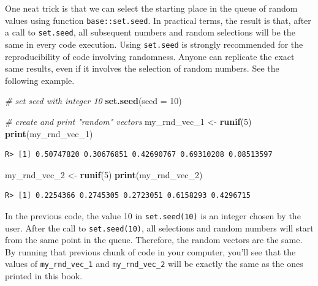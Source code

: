 \documentclass[
  12pt,
]{book}
\newenvironment{Shaded}{\begin{snugshade}}{\end{snugshade}}
\newcommand{\CommentTok}[1]{\textcolor[rgb]{0.37,0.37,0.37}{\textit{#1}}}
\newcommand{\DataTypeTok}[1]{\textcolor[rgb]{0.27,0.27,0.27}{#1}}
\newcommand{\DecValTok}[1]{\textcolor[rgb]{0.06,0.06,0.06}{#1}}
\newcommand{\KeywordTok}[1]{\textcolor[rgb]{0.27,0.27,0.27}{\textbf{#1}}}
\newcommand{\NormalTok}[1]{#1}
\newcommand{\StringTok}[1]{\textcolor[rgb]{0.5,0.5,0.5}{#1}}
\begin{document}
One neat trick is that we can select the starting place in the queue of random values using function \texttt{base::set.seed}. In practical terms, the result is that, after a call to \texttt{set.seed}, all subsequent numbers and random selections will be the same in every code execution. Using \texttt{set.seed} is strongly recommended for the reproducibility of code involving randomness. Anyone can replicate the exact same results, even if it involves the selection of random numbers. See the following example. 

\begin{Shaded}
\begin{Highlighting}[]
\CommentTok{# set seed with integer 10}
\KeywordTok{set.seed}\NormalTok{(}\DataTypeTok{seed =} \DecValTok{10}\NormalTok{)}

\CommentTok{# create and print "random" vectors}
\NormalTok{my_rnd_vec_}\DecValTok{1}\NormalTok{ <-}\StringTok{ }\KeywordTok{runif}\NormalTok{(}\DecValTok{5}\NormalTok{)}
\KeywordTok{print}\NormalTok{(my_rnd_vec_}\DecValTok{1}\NormalTok{)}
\end{Highlighting}
\end{Shaded}

\begin{verbatim}
R> [1] 0.50747820 0.30676851 0.42690767 0.69310208 0.08513597
\end{verbatim}

\begin{Shaded}
\begin{Highlighting}[]
\NormalTok{my_rnd_vec_}\DecValTok{2}\NormalTok{ <-}\StringTok{ }\KeywordTok{runif}\NormalTok{(}\DecValTok{5}\NormalTok{)}
\KeywordTok{print}\NormalTok{(my_rnd_vec_}\DecValTok{2}\NormalTok{)}
\end{Highlighting}
\end{Shaded}

\begin{verbatim}
R> [1] 0.2254366 0.2745305 0.2723051 0.6158293 0.4296715
\end{verbatim}

In the previous code, the value 10 in \texttt{set.seed(10)} is an integer chosen by the user. After the call to \texttt{set.seed(10)}, all selections and random numbers will start from the same point in the queue. Therefore, the random vectors are the same. By running that previous chunk of code in your computer, you'll see that the values of \texttt{my\_rnd\_vec\_1} and \texttt{my\_rnd\_vec\_2} will be exactly the same as the ones printed in this book.
\end{document}
